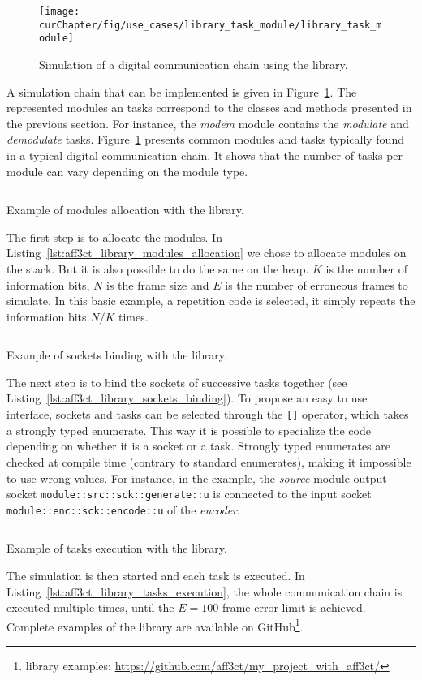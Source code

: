 \begin{figure}[htp]
  \centering
  \texttt{[image: \\curChapter/fig/use\_cases/library\_task\_module/library\_task\_module]}
  \caption{Simulation of a digital communication chain using the \AFFECT
    library.}
  \label{fig:aff3ct_library_task_module}
\end{figure}
A simulation chain that can be implemented is given in
Figure~\ref{fig:aff3ct_library_task_module}. The represented modules an tasks
correspond to the classes and methods presented in the previous section. For
instance, the \textit{modem} module contains the \textit{modulate} and
\textit{demodulate} tasks. Figure~\ref{fig:aff3ct_library_task_module} presents
common modules and tasks typically found in a typical digital communication
chain. It shows that the number of tasks per module can vary depending on the
module type.
\begin{listing}[htp]
  \inputminted[frame=lines,linenos]{C++}{\curChapter/src/use_cases/library/modules_allocation.cpp}
  \caption{Example of modules allocation with the \AFFECT library.}
  \label{lst:aff3ct_library_modules_allocation}
\end{listing}
The first step is to allocate the modules. In
Listing~\ref{lst:aff3ct_library_modules_allocation} we chose to allocate modules
on the stack. But it is also possible to do the same on the heap. $K$ is the
number of information bits, $N$ is the frame size and $E$ is the number of
erroneous frames to simulate. In this basic example, a repetition code is
selected, it simply repeats the information bits $N/K$ times.
\begin{listing}[htp]
  \inputminted[frame=lines,linenos]{C++}{\curChapter/src/use_cases/library/sockets_binding.cpp}
  \caption{Example of sockets binding with the \AFFECT library.}
  \label{lst:aff3ct_library_sockets_binding}
\end{listing}
The next step is to bind the sockets of successive tasks together (see
Listing~\ref{lst:aff3ct_library_sockets_binding}). To propose an easy to use
interface, sockets and tasks can be selected through the \verb|[]| operator,
which takes a \Cxx strongly typed enumerate. This way it is possible to
specialize the code depending on whether it is a socket or a task. Strongly
typed enumerates are checked at compile time (contrary to standard enumerates),
making it impossible to use wrong values. For instance, in the example, the
\textit{source} module output socket \verb|module::src::sck::generate::u| is
connected to the input socket \verb|module::enc::sck::encode::u| of the
\textit{encoder}.
\begin{listing}[htp]
  \inputminted[frame=lines,linenos]{C++}{\curChapter/src/use_cases/library/tasks_execution.cpp}
  \caption{Example of tasks execution with the \AFFECT library.}
  \label{lst:aff3ct_library_tasks_execution}
\end{listing}
The simulation is then started and each task is executed. In
Listing~\ref{lst:aff3ct_library_tasks_execution}, the whole communication chain
is executed multiple times, until the $E = 100$ frame error limit is achieved.
Complete examples of the \AFFECT library are available on
GitHub\footnote{\AFFECT library examples: \url{https://github.com/aff3ct/my_project_with_aff3ct/}}.

